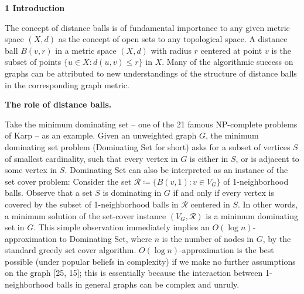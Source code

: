 \par\medskip\noindent\textbf{1 Introduction}\par
The concept of distance balls is of fundamental importance to any given metric space $(X,d)$ as the concept of open sets to any topological space. A distance ball $B(v,r)$ in a metric space $(X,d)$ with radius $r$ centered at point $v$ is the subset of points $\{u\in X:d(u,v)\leq r\}$ in $X$. Many of the algorithmic success on graphs can be attributed to new understandings of the structure of distance balls in the corresponding graph metric.
\par
\par
\par\medskip\noindent\textbf{The role of distance balls.}\par
Take the minimum dominating set – one of the 21 famous NP-complete problems of Karp – as an example. Given an unweighted graph $G$, the minimum dominating set problem (Dominating Set for short) asks for a subset of vertices $S$ of smallest cardinality, such that every vertex in $G$ is either in $S$, or is adjacent to some vertex in $S$. Dominating Set can also be interpreted as an instance of the set cover problem: Consider the set $\mathcal{R}\coloneqq\{B(v,1):v\in V_{G}\}$ of 1-neighborhood balls. Observe that a set $S$ is dominating in $G$ if and only if every vertex is covered by the subset of 1-neighborhood balls in $\mathcal{R}$ centered in $S$. In other words, a minimum solution of the set-cover instance $(V_{G},\mathcal{R})$ is a minimum dominating set in $G$. This simple observation immediately implies an $O(\log n)$-approximation to Dominating Set, where $n$ is the number of nodes in $G$, by the standard greedy set cover algorithm. $O(\log n)$-approximation is the best possible (under popular beliefs in complexity) if we make no further assumptions on the graph [25, 15]; this is essentially because the interaction between 1-neighborhood balls in general graphs can be complex and unruly.
\par
\par
